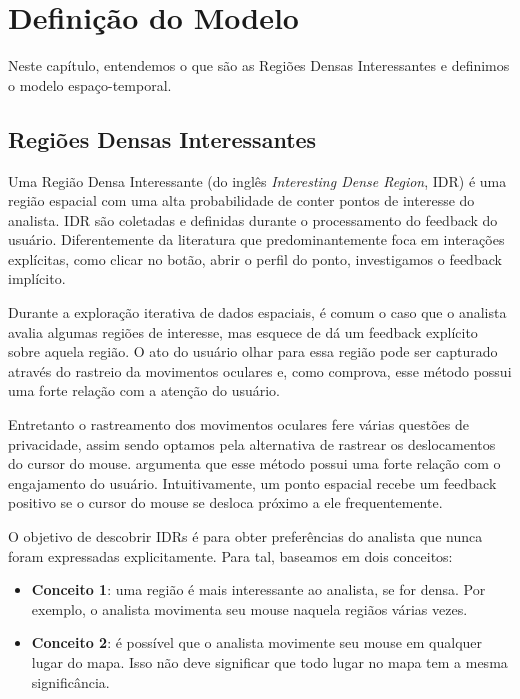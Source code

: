 \chapter{Definição do Modelo}
\label{chap:modelo}



Neste capítulo, entendemos o que são as Regiões Densas Interessantes e definimos o modelo espaço-temporal.

\section{Regiões Densas Interessantes}


Uma Região Densa Interessante (do inglês {\em Interesting Dense Region}, IDR) é uma região espacial com uma alta probabilidade de conter pontos de interesse do analista. IDR são coletadas e definidas durante o processamento do feedback do usuário. Diferentemente da literatura que predominantemente foca em interações explícitas, como clicar no botão, abrir o perfil do ponto, investigamos o feedback implícito.

Durante a exploração iterativa de dados espaciais, é comum o caso que o analista avalia algumas regiões de interesse, mas esquece de dá um feedback explícito sobre aquela região. O ato do usuário olhar para essa região pode ser capturado através do rastreio da movimentos oculares e, como  comprova, esse método possui uma forte relação com a atenção do usuário.

Entretanto o rastreamento dos movimentos oculares fere várias questões de privacidade, assim sendo optamos pela alternativa de rastrear os deslocamentos do cursor do mouse.  argumenta que esse método possui uma forte relação com o engajamento do usuário. Intuitivamente, um ponto espacial recebe um feedback positivo se o cursor do mouse se desloca próximo a ele frequentemente.

O objetivo de descobrir IDRs é para obter preferências do analista que nunca foram expressadas explicitamente. Para tal, baseamos em dois conceitos:

\begin{itemize}
	\item \textbf{Conceito 1}: uma região é mais interessante ao analista, se for densa. Por exemplo, o analista movimenta seu mouse naquela regiãos várias vezes.
	\item \textbf{Conceito 2}: é possível que o analista movimente seu mouse em qualquer lugar do mapa. Isso não deve significar que todo lugar no mapa tem a mesma significância.
\end{itemize}


